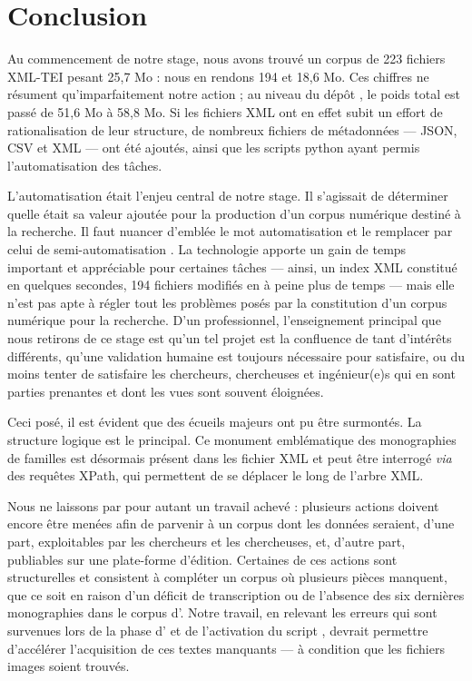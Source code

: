 \part*{Conclusion}


Au commencement de notre stage, nous avons trouvé un corpus de 223 fichiers XML-TEI pesant 25,7 Mo : nous en rendons 194 et 18,6 Mo. Ces chiffres ne résument qu'imparfaitement notre action ; au niveau du dépôt \gitlab, le poids total est passé de 51,6 Mo à 58,8 Mo. Si les fichiers XML ont en effet subit un effort de rationalisation de leur structure, de nombreux fichiers de métadonnées --- JSON, CSV et XML --- ont été ajoutés, ainsi que les scripts python ayant permis l'automatisation des tâches.

L'automatisation était l'enjeu central de notre stage. Il s'agissait de déterminer quelle était sa valeur ajoutée pour la production d'un corpus numérique destiné à la recherche. Il faut nuancer d'emblée le mot \og automatisation \fg{} et le remplacer par celui de \og semi-automatisation \fg{}. La technologie apporte un gain de temps important et appréciable pour certaines tâches --- ainsi, un index XML constitué en quelques secondes, 194 fichiers modifiés en à peine plus de temps --- mais elle n'est pas apte à régler tout les problèmes posés par la constitution d'un corpus numérique pour la recherche.  D'un \pov{} professionnel, l'enseignement principal que nous retirons de ce stage est qu'un tel projet est la confluence de tant d'intérêts différents, qu'une validation humaine est toujours nécessaire pour satisfaire, ou du moins tenter de satisfaire les chercheurs, chercheuses et ingénieur(e)s qui en sont parties prenantes et dont les vues sont souvent éloignées.

Ceci posé, il est évident que des écueils majeurs ont pu être surmontés. La structure logique est le principal. Ce monument emblématique des monographies de familles est désormais présent dans les fichier XML et peut être interrogé \textit{via} des requêtes XPath, qui permettent de se déplacer le long de l'arbre XML.

Nous ne laissons par pour autant un travail achevé : plusieurs actions doivent encore être menées afin de parvenir à un corpus dont les données seraient, d'une part, exploitables par les chercheurs et les chercheuses, et, d'autre part, publiables sur une plate-forme d'édition. Certaines de ces actions sont structurelles et consistent à compléter un corpus où plusieurs pièces manquent, que ce soit en raison d'un déficit de transcription ou de l'absence des six dernières monographies dans le corpus d'\ia. Notre travail, en relevant les erreurs qui sont survenues lors de la phase d'\ocr{} et de l'activation du script \lse, devrait permettre d'accélérer l'acquisition de ces textes manquants --- à condition que les fichiers images soient trouvés.

